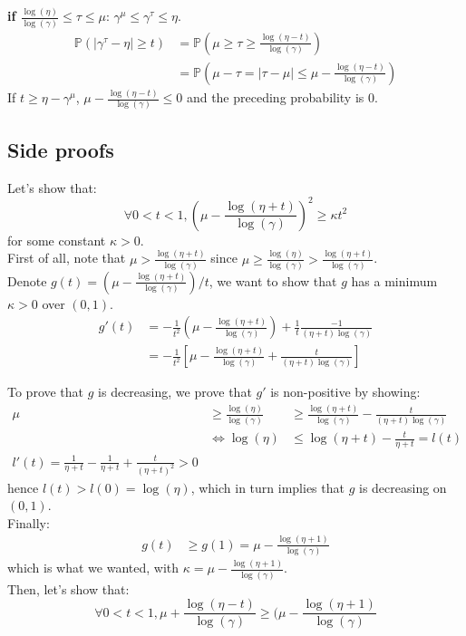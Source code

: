 \documentclass{article}
\begin{document}
\textbf{if $\frac{\log(\eta)}{\log(\gamma)} \leq \tau \leq \mu$}:
$\gamma^\mu \leq \gamma^\tau \leq \eta$.
\begin{align}
  \mathbb{P}(|\gamma^\tau - \eta | \geq t) &= \mathbb{P}(\mu \geq \tau \geq \frac{\log(\eta - t)}{\log(\gamma)})\\
  &= \mathbb{P}(\mu - \tau = |\tau - \mu| \leq \mu - \frac{\log(\eta - t)}{\log(\gamma)})
\end{align}
If $t \geq \eta - \gamma^\mu$, $\mu - \frac{\log(\eta - t)}{\log(\gamma)} \leq 0$ and the preceding probability is $0$.

\subsection{Side proofs}

Let's show that:
$$\forall 0 < t < 1, (\mu - \frac{\log(\eta + t)}{\log(\gamma)})^2 \geq \kappa t^2$$ for some constant $\kappa > 0$.\\
First of all, note that $\mu > \frac{\log(\eta + t)}{\log(\gamma)}$ since $\mu \geq \frac{\log(\eta)}{\log(\gamma)} > \frac{\log(\eta + t )}{\log(\gamma)}$.\\
Denote $g(t) = (\mu - \frac{\log(\eta + t)}{\log(\gamma)})/t$, we want to show that $g$ has a minimum $\kappa > 0$ over $(0, 1)$.\\
\begin{align}
  g'(t) &= - \frac{1}{t^2}(\mu - \frac{\log(\eta + t)}{\log(\gamma)}) + \frac{1}{t}\frac{-1}{(\eta + t) \log(\gamma)}\\
  &= - \frac{1}{t^2}[\mu - \frac{\log(\eta + t)}{\log(\gamma)} + \frac{t}{(\eta + t) \log(\gamma)}]
\end{align}

To prove that $g$ is decreasing, we prove that $g'$ is non-positive by showing:
\begin{align}
  \mu &\geq \frac{\log(\eta)}{\log(\gamma)} &\geq \frac{\log(\eta + t)}{\log(\gamma)} - \frac{t}{(\eta + t)\log(\gamma)}\\
  &\iff \log(\eta) &\leq \log(\eta + t) -  \frac{t}{\eta + t} = l(t)\\
  l'(t) = \frac{1}{\eta + t} - \frac{1}{\eta + t} + \frac{t}{(\eta + t)^2} > 0
\end{align}
hence $l(t) > l(0) = \log(\eta)$, which in turn implies that $g$ is decreasing on $(0, 1)$.\\
Finally:
\begin{align}
  g(t) &\geq g(1) = \mu - \frac{\log(\eta + 1)}{\log(\gamma)}
\end{align}
which is what we wanted, with $\kappa = \mu - \frac{\log(\eta + 1)}{\log(\gamma)}$.\\

Then, let's show that:
$$\forall 0 < t < 1, \mu + \frac{\log(\eta - t)}{\log(\gamma)} \geq (\mu - \frac{\log(\eta + 1)}{\log(\gamma)}$$
\end{document}
